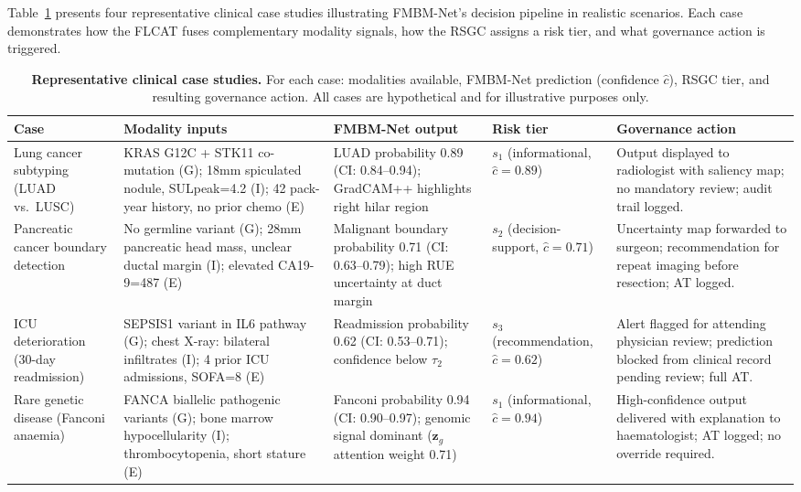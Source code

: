 \documentclass[a4paper,fleqn]{cas-dc}
\begin{document}
Table~\ref{tab:cases} presents four representative clinical case studies
illustrating FMBM-Net's decision pipeline in realistic scenarios.
Each case demonstrates how the FLCAT fuses complementary modality signals,
how the RSGC assigns a risk tier, and what governance action is triggered.

\begin{table}[!t]
\caption{\textbf{Representative clinical case studies.} For each case:
modalities available, FMBM-Net prediction (confidence $\hat{c}$), RSGC tier,
and resulting governance action. All cases are hypothetical and for
illustrative purposes only.}
\label{tab:cases}
\centering
\renewcommand{\arraystretch}{1.25}
\setlength{\tabcolsep}{4pt}
\small
\begin{tabular}{p{1.7cm}p{3.6cm}p{3.6cm}p{1.6cm}p{3.7cm}}
\toprule
\textbf{Case} & \textbf{Modality inputs} & \textbf{FMBM-Net output} & \textbf{Risk tier} & \textbf{Governance action}\\
\midrule
Lung cancer subtyping (LUAD vs.\ LUSC)
  & KRAS G12C + STK11 co-mutation (G); 18mm spiculated nodule, SULpeak=4.2 (I); 42 pack-year history, no prior chemo (E)
  & LUAD probability 0.89 (CI: 0.84--0.94); GradCAM++ highlights right hilar region
  & $s_1$ (informational, $\hat{c}\!=\!0.89$)
  & Output displayed to radiologist with saliency map; no mandatory review; audit trail logged.\\
\midrule
Pancreatic cancer boundary detection
  & No germline variant (G); 28mm pancreatic head mass, unclear ductal margin (I); elevated CA19-9=487 (E)
  & Malignant boundary probability 0.71 (CI: 0.63--0.79); high RUE uncertainty at duct margin
  & $s_2$ (decision-support, $\hat{c}\!=\!0.71$)
  & Uncertainty map forwarded to surgeon; recommendation for repeat imaging before resection; AT logged.\\
\midrule
ICU deterioration (30-day readmission)
  & SEPSIS1 variant in IL6 pathway (G); chest X-ray: bilateral infiltrates (I); 4 prior ICU admissions, SOFA=8 (E)
  & Readmission probability 0.62 (CI: 0.53--0.71); confidence below $\tau_2$
  & $s_3$ (recommendation, $\hat{c}\!=\!0.62$)
  & Alert flagged for attending physician review; prediction blocked from clinical record pending review; full AT.\\
\midrule
Rare genetic disease (Fanconi anaemia)
  & FANCA biallelic pathogenic variants (G); bone marrow hypocellularity (I); thrombocytopenia, short stature (E)
  & Fanconi probability 0.94 (CI: 0.90--0.97); genomic signal dominant ($\mathbf{z}_g$ attention weight 0.71)
  & $s_1$ (informational, $\hat{c}\!=\!0.94$)
  & High-confidence output delivered with explanation to haematologist; AT logged; no override required.\\
\bottomrule
\end{tabular}
\end{table}
\end{document}

